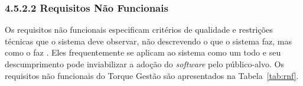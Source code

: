 \documentclass[12pt, a4paper]{article}
\begin{document}
\subsubsection{4.5.2.2 Requisitos Não Funcionais}

Os requisitos não funcionais especificam critérios de qualidade e restrições
técnicas que o sistema deve observar, não descrevendo o que o sistema faz, mas
como o faz \cite{sommerville2011}. Eles frequentemente se aplicam ao sistema
como um todo e seu descumprimento pode inviabilizar a adoção do
\textit{software} pelo público-alvo. Os requisitos não funcionais do Torque
Gestão são apresentados na Tabela~\ref{tab:rnf}.

\end{document}
